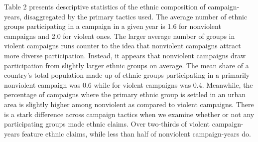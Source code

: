 \documentclass[
  letterpaper,
  DIV=11,
  numbers=noendperiod]{scrartcl}
\begin{document}
\begin{table}
\centering\centering
\caption{Ethnic attributes of NAVCO 2.1 campaign-years.}
\centering
{}
\end{table}

Table 2 presents descriptive statistics of the ethnic composition of
campaign-years, disaggregated by the primary tactics used. The average
number of ethnic groups participating in a campaign in a given year is
1.6 for nonviolent campaigns and 2.0 for violent ones. The larger
average number of groups in violent campaigns runs counter to the idea
that nonviolent campaigns attract more diverse participation. Instead,
it appears that nonviolent campaigns draw participation from slightly
larger ethnic groups on average. The mean share of a country's total
population made up of ethnic groups participating in a primarily
nonviolent campaign was 0.6 while for violent campaigns was 0.4.
Meanwhile, the percentage of campaigns where the primary ethnic group is
settled in an urban area is slightly higher among nonviolent as compared
to violent campaigns. There is a stark difference across campaign
tactics when we examine whether or not any participating groups made
ethnic claims. Over two-thirds of violent campaign-years feature ethnic
claims, while less than half of nonviolent campaign-years do.
\end{document}
